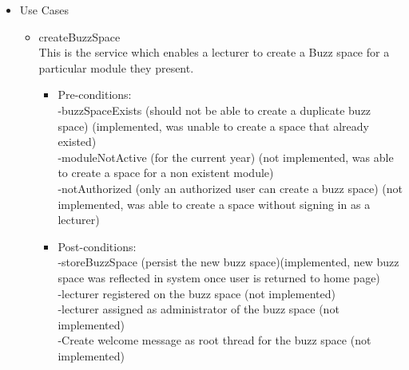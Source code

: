 \begin {itemize}
\item Use Cases
\begin {itemize}
\item {createBuzzSpace}\\
This is the service which enables a lecturer to create a Buzz space for a particular module they present.
\begin {itemize}
\item Pre-conditions:\\
-buzzSpaceExists (should not be able to create a duplicate buzz space) (implemented, was unable to create a space that already existed)\\
-moduleNotActive (for the current year) (not implemented, was able to create a space for a non existent module)\\
-notAuthorized (only an authorized user can create a buzz space) (not implemented, was able to create a space without signing in as a lecturer)\\

\item Post-conditions:\\
-storeBuzzSpace (persist the new buzz space)(implemented, new buzz space was reflected in system once user is returned to home page)\\
-lecturer registered on the buzz space (not implemented)\\
-lecturer assigned as administrator of the buzz space (not implemented)\\
-Create welcome message as root thread for the buzz space (not implemented)\\
\end {itemize}
\end{itemize}
\end{itemize}